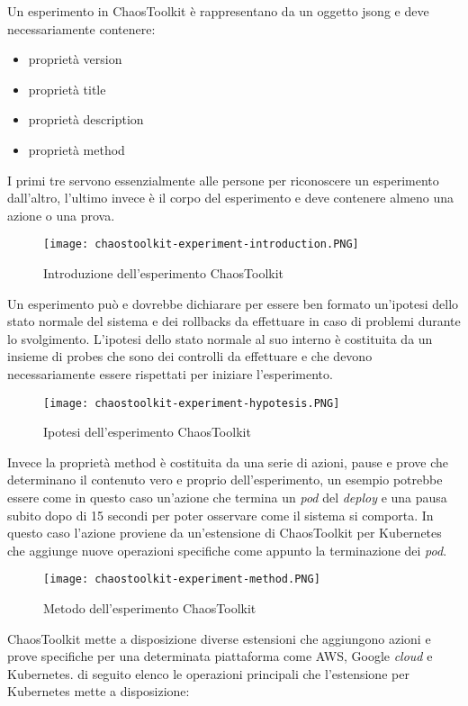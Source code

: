 Un esperimento in ChaosToolkit è rappresentano da un oggetto \gls{jsong} e deve necessariamente contenere:
\begin{itemize}
    \item proprietà version
    \item proprietà title
    \item proprietà description
    \item proprietà method
\end{itemize}
I primi tre servono essenzialmente alle persone per riconoscere un esperimento dall'altro, l'ultimo invece è il corpo del esperimento e deve contenere almeno una azione o una prova.
\begin{figure}[H]
    \centering
    \texttt{[image: chaostoolkit-experiment-introduction.PNG]}
    \label{tab:introduzione-chaostoolkit}
    \caption{Introduzione dell'esperimento ChaosToolkit}
\end{figure}
Un esperimento può e dovrebbe dichiarare per essere ben formato un'ipotesi dello stato normale del sistema e dei rollbacks da effettuare in caso di problemi durante lo svolgimento.
L'ipotesi dello stato normale al suo interno è costituita da un insieme di probes che sono dei controlli da effettuare e che devono necessariamente essere rispettati per iniziare l'esperimento.
\begin{figure}[H]
    \centering
    \texttt{[image: chaostoolkit-experiment-hypotesis.PNG]}
    \label{tab:ipotesi-chaostoolkit}
    \caption{Ipotesi dell'esperimento ChaosToolkit}
\end{figure}
Invece la proprietà method è costituita da una serie di azioni, pause e prove che determinano il contenuto vero e proprio dell'esperimento, un esempio potrebbe essere come in questo caso un'azione che termina un \textit{pod} del \textit{deploy} e una pausa subito dopo di 15 secondi per poter osservare come il sistema si comporta.
In questo caso l'azione proviene da un'estensione di ChaosToolkit per Kubernetes che aggiunge nuove operazioni specifiche come appunto la terminazione dei \textit{pod}.
\begin{figure}[H]
    \centering
    \texttt{[image: chaostoolkit-experiment-method.PNG]}
    \label{tab:method-chaostoolkit}
    \caption{Metodo dell'esperimento ChaosToolkit}
\end{figure}
ChaosToolkit mette a disposizione diverse estensioni che aggiungono azioni e prove specifiche per una determinata piattaforma come AWS, Google \textit{cloud} e Kubernetes.
 di seguito elenco le operazioni principali che l'estensione per Kubernetes mette a disposizione:
